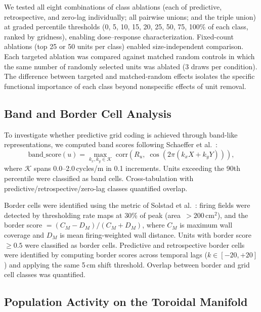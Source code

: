 \documentclass[11pt]{article}
\begin{document}
We tested all eight combinations of class ablations (each of predictive, retrospective, and zero-lag individually; all pairwise unions; and the triple union) at graded percentile thresholds (0, 5, 10, 15, 20, 25, 50, 75, 100\% of each class, ranked by gridness), enabling dose--response characterization. Fixed-count ablations (top 25 or 50 units per class) enabled size-independent comparison. Each targeted ablation was compared against matched random controls in which the same number of randomly selected units was ablated (3 draws per condition). The difference between targeted and matched-random effects isolates the specific functional importance of each class beyond nonspecific effects of unit removal.


\subsection*{Band and Border Cell Analysis}

To investigate whether predictive grid coding is achieved through band-like representations, we computed band scores following Schaeffer et al.\ \cite{schaeffer2024}:
\begin{equation}
    \mathrm{band\_score}(u) = \max_{k_x, k_y \in \mathcal{K}}\;\mathrm{corr}\!\left(R_u,\;\cos\!\left(2\pi(k_x X + k_y Y)\right)\right),
\end{equation}
where $\mathcal{K}$ spans 0.0--2.0\,cycles/m in 0.1 increments. Units exceeding the 90th percentile were classified as band cells. Cross-tabulation with predictive/retrospective/zero-lag classes quantified overlap.

Border cells were identified using the metric of Solstad et al.\ \cite{solstad2008}: firing fields were detected by thresholding rate maps at 30\% of peak (area~$> 200$\,cm$^2$), and the border score $= (C_M - D_M)/(C_M + D_M)$, where $C_M$ is maximum wall coverage and $D_M$ is mean firing-weighted wall distance. Units with border score~$\ge 0.5$ were classified as border cells. Predictive and retrospective border cells were identified by computing border scores across temporal lags ($k \in [-20, +20]$) and applying the same 5\,cm shift threshold. Overlap between border and grid cell classes was quantified.


\subsection*{Population Activity on the Toroidal Manifold}
\end{document}
